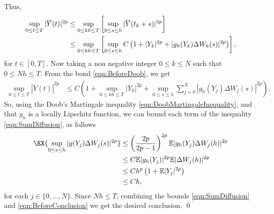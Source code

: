 \documentclass[sort&compress, preprint]{elsarticle}
\theoremstyle{definition}
\theoremstyle{plain}%
\theoremstyle{remark}
\newcommand{\m}[1]{\mathbb{E}#1}
\begin{document}
	Thus, 
	\begin{align}
		\sup_{0\leq t\leq T} |\overline{Y}(t)|^{2p}
		&\leq
			\sup_{0\leq kh\leq T}
			\left[
				\sup_{0\leq s\leq h}
					|\overline{Y}(t_k+s)|^{2p} 
			\right] 
		\notag\\
		&\leq
			\sup_{0\leq kh\leq T} 
			\left[
				\sup_{0\leq s\leq h}
					C 
					\left(
						1 + |Y_k|^{2p} + |g_h(Y_k)\Delta W_k(s)|^{2p}
					\right)
			\right],
		\label{eqn:BeforeDoob}
	\end{align}
	for $t\in [0,T]$.
	Now taking a non negative integer $0 \leq k \leq N$ such that $0\leq Nh \leq T$. From the bond 
	\eqref{eqn:BeforeDoob}, we get
	\begin{align}
		\sup_{0\leq t\leq T} |\overline{Y}(t)|^{2p}
		&\leq 
			C
			\left(
				1
				+
				\sup_{0\leq kh\leq T} 
					|Y_k|^{2p}
					+
					\sup_{0\leq s\leq h}
						\sum_{j=0}^N
							|g_h(Y_j)\Delta W_j(s)|^{2p}
			\right) \label{eqn:SumDiffusion}.
	\end{align}
	So, using the Doob's Martingale inequality \eqref{eqn:DoobMartingaleInequality},
	 and that $g_h$ is a locally 
	Lipschitz function, we can bound each term of the inequality \eqref{eqn:SumDiffusion},  as follows
	\begin{align}
		\EX{
			\sup_{0 \leq s \leq h} |g(Y_j) \Delta W_j(s)|^{2p}
		}
		&\leq
			\left(
				\frac{2p}{2p-1}
			\right)^{2p}
			\m|g_h(Y_j)\Delta W_j(h)|^{2p}
			\notag
			\\
		&\leq
			C \m |g_h(Y_j)|^{2p} \m |\Delta W_j(h)|^{2p} \notag\\
		&\leq
			C h^p
			\left(
				1 + \m|Y_j|^{2p}
			\right) \notag \\
		& \leq C h, \label{eqn:BeforeConclusion}
	\end{align}
	for each $j \in \{0,\dots, N\}$.
	Since $Nh\leq T$, combining the bounds \eqref{eqn:SumDiffusion} and \eqref{eqn:BeforeConclusion} we 
	get the desired conclusion. \qed
\end{document}
